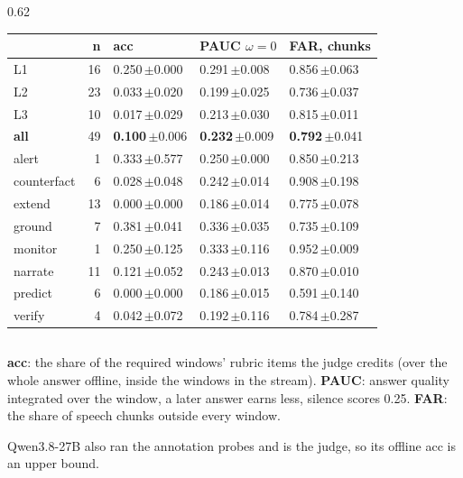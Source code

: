 \documentclass[aspectratio=169,10pt]{beamer}
\newcommand{\sd}[1]{{\color{muted}\,$\pm$#1}}  %
\begin{document}
\begin{frame}
\begin{columns}[T]
\begin{column}{0.62\textwidth}
\begin{tabular}{@{}lrlll@{}}
        \toprule
        & \textbf{n} & \textbf{acc} & \textbf{PAUC} $\omega{=}0$ & \textbf{FAR}, chunks \\
        \midrule
        L1 & 16 & 0.250\sd{0.000} & 0.291\sd{0.008} & 0.856\sd{0.063} \\
        L2 & 23 & 0.033\sd{0.020} & 0.199\sd{0.025} & 0.736\sd{0.037} \\
        L3 & 10 & 0.017\sd{0.029} & 0.213\sd{0.030} & 0.815\sd{0.011} \\
        \textbf{all} & 49 & \textbf{0.100}\sd{0.006} & \textbf{0.232}\sd{0.009} & \textbf{0.792}\sd{0.041} \\
        \midrule
        alert       &  1 & 0.333\sd{0.577} & 0.250\sd{0.000} & 0.850\sd{0.213} \\
        counterfact &  6 & 0.028\sd{0.048} & 0.242\sd{0.014} & 0.908\sd{0.198} \\
        extend      & 13 & 0.000\sd{0.000} & 0.186\sd{0.014} & 0.775\sd{0.078} \\
        ground      &  7 & 0.381\sd{0.041} & 0.336\sd{0.035} & 0.735\sd{0.109} \\
        monitor     &  1 & 0.250\sd{0.125} & 0.333\sd{0.116} & 0.952\sd{0.009} \\
        narrate     & 11 & 0.121\sd{0.052} & 0.243\sd{0.013} & 0.870\sd{0.010} \\
        predict     &  6 & 0.000\sd{0.000} & 0.186\sd{0.015} & 0.591\sd{0.140} \\
        verify      &  4 & 0.042\sd{0.072} & 0.192\sd{0.116} & 0.784\sd{0.287} \\
        \bottomrule
      \end{tabular}
    \end{column}
  \end{columns}

  \vspace{0.6em}
  {\color{muted}\tiny \textbf{acc}: the share of the required windows' rubric items the judge credits
  (over the whole answer offline, inside the windows in the stream).
  \textbf{PAUC}: answer quality integrated over the window, a later answer earns less, silence scores 0.25.
  \textbf{FAR}: the share of speech chunks outside every window.\par\vspace{0.3em}
  Qwen3.8-27B also ran the annotation probes and is the judge, so its offline acc is an upper bound.\par}
\end{frame}
\end{document}
